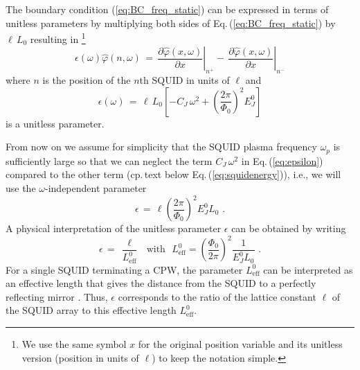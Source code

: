 %
The boundary condition (\ref{eq:BC_freq_static}) can be expressed in terms of unitless parameters
by multiplying both sides of Eq.\,(\ref{eq:BC_freq_static}) by $\ell \, L_0$ resulting in
%
\footnote{We use the same symbol $x$ for the original position variable and its 
unitless version (position in units of $\ell$) to keep the notation simple.}
%
\begin{equation}\label{eq:BC_freq_static_unitless}
\epsilon(\omega) \hat{\varphi}(n, \omega) \, = \, 
\left.\frac{\partial \hat{\varphi}(x, \omega)}{\partial x}\right|_{n^{+}}
- \, \left.\frac{\partial \hat{\varphi}(x,\omega)}{\partial x}\right|_{n^{-}}
\end{equation}
%
where $n$ is the position of the $n$th SQUID in units of $\ell$ and 
%
\begin{equation} \label{eq:epsilon}
\epsilon(\omega) \, = \, \ell \, L_0 \left[ - C_{J} \, \omega^2 + 
\left(\frac{2 \pi}{\Phi_{0}}\right)^{2} E_J^0 \right] 
\end{equation}
%
is a unitless parameter.

From now on we assume for simplicity that the SQUID plasma frequency $\omega_p$ is sufficiently 
large so that we can neglect the term $C_{J} \, \omega^2$ in Eq.\,(\ref{eq:epsilon}) compared to 
the other term \cite{Johansson2010}
(cp.\,text below Eq.\,(\ref{eq:squidenergy})), i.e., we will use the $\omega$-independent parameter
\newpage
%
\begin{equation} \label{eq:epsilon2}
\epsilon \, = \, \ell \left(\frac{2 \pi}{\Phi_{0}}\right)^{2} E_J^0 L_0 \, \, .
\end{equation}
%
A physical interpretation of the unitless parameter $\epsilon$ can be obtained by writing
%
\begin{equation} \label{eq:epsilon_ip}
\epsilon \, = \, \frac{\ell}{L_{\text{eff}}^0} \, \, \, \, \text{with} 
\, \, \, \, L_{\text{eff}}^0 = \left(\frac{\Phi_0}{2 \pi}\right)^{2} \frac{1}{E_J^0 L_0} \, \, .
\end{equation}
%
For a single SQUID terminating a CPW, the parameter $L_{\text{eff}}^0$ can be interpreted
as an effective length that gives the distance from the SQUID to a perfectly reflecting mirror 
\cite{Johansson2010}. Thus, $\epsilon$ corresponds to the ratio of the lattice constant $\ell$
of the SQUID array to this effective length $L_{\text{eff}}^0$. 



